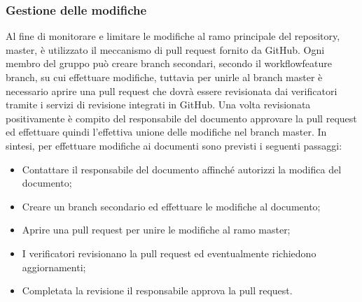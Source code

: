 	\subsubsection{Gestione delle modifiche}
		Al fine di monitorare e limitare le modifiche al ramo principale del repository\glo, master, è utilizzato il meccanismo di pull request fornito da GitHub. Ogni membro del gruppo può creare branch secondari, secondo il workflow\glosp feature branch, su cui effettuare modifiche, tuttavia per unirle al branch master è necessario aprire una pull request che dovrà essere revisionata dai verificatori tramite i servizi di revisione integrati in GitHub. Una volta revisionata positivamente è compito del responsabile del documento approvare la pull request ed effettuare quindi l'effettiva unione delle modifiche nel branch master.
		\newline
		In sintesi, per effettuare modifiche ai documenti sono previsti i seguenti passaggi:
		\begin{itemize}
			\item Contattare il responsabile del documento affinché autorizzi la modifica del documento;
			\item Creare un branch secondario ed effettuare le modifiche al documento;
			\item Aprire una pull request per unire le modifiche al ramo master;
			\item I verificatori revisionano la pull request ed eventualmente richiedono aggiornamenti;
			\item Completata la revisione il responsabile approva la pull request.
		\end{itemize}
		
